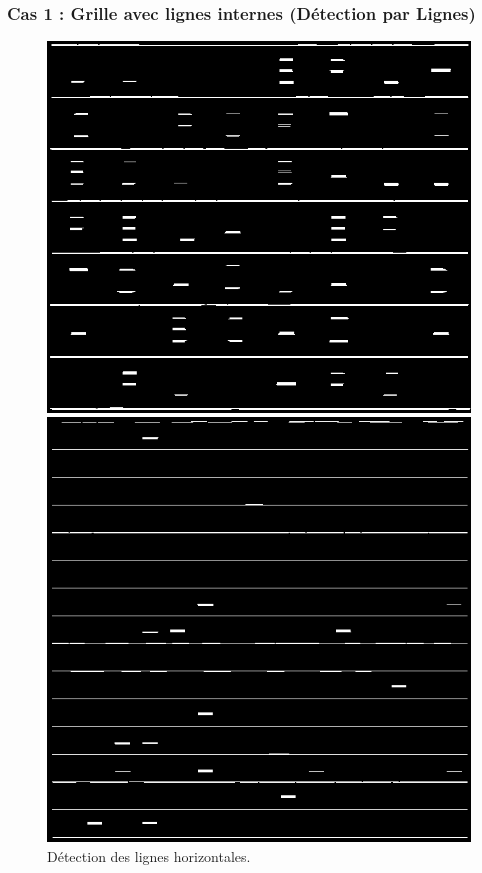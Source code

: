\documentclass{article}
\begin{document}
\subsubsection{Cas 1 : Grille avec lignes internes (Détection par Lignes)}

\begin{figure}[H]
  \centering
      \includegraphics[width=\linewidth]{ressources/image_1_step_09_horizontal_lines.png}
      \caption{}
    \endminipage\quad\quad\quad\quad
    \includegraphics[width=\linewidth]{ressources/image_2_step_09_horizontal_lines.png}
    \caption{}
  \endminipage
  \caption{Détection des lignes horizontales.}
\end{figure}
\end{document}
